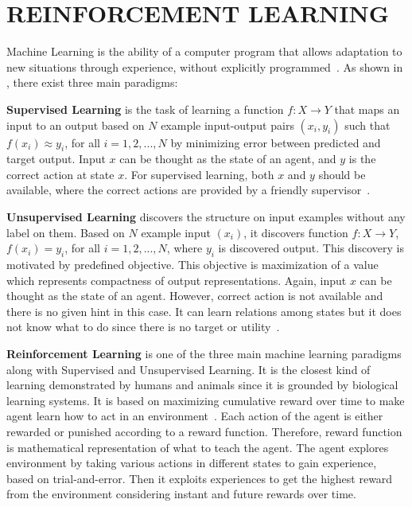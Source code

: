\chapter{REINFORCEMENT LEARNING}
\label{chap:rl_chap}

Machine Learning is the ability of a computer program that allows 
adaptation to new situations through experience, 
without explicitly programmed~\cite{mitchell_machine_1997}. 
As shown in , there exist three main paradigms: 

\textbf{Supervised Learning} is the task of learning a function $f \colon X \rightarrow Y$ 
that maps an input to an output based on $N$ example input-output pairs $(x_i,y_i)$ 
such that $ f(x_i) \approx y_i$, for all $i={1,2,...,N}$ 
by minimizing error between predicted and target output. 
Input $x$ can be thought as the state of an agent, and $y$ is the correct action at state $x$. 
For supervised learning, both $x$ and $y$ should be available, 
where the correct actions are provided by a friendly supervisor~\cite{russell_artificial_nodate}. 

\textbf{Unsupervised Learning} discovers the structure on input examples without any label on them. 
Based on $N$ example input $(x_i)$, 
it discovers function $f \colon X \rightarrow Y$, $ f(x_i) = y_i$, for all $i={1,2,...,N} $, 
where $y_i$ is discovered output. 
This discovery is motivated by predefined objective. 
This objective is maximization of a value which represents compactness of output representations. 
Again, input $x$ can be thought as the state of an agent. 
However, correct action is not available and there is no given hint in this case. 
It can learn relations among states but it does not know what to do 
since there is no target or utility~\cite{russell_artificial_nodate}.
 
\textbf{Reinforcement Learning} is one of the three main machine learning paradigms along with Supervised and Unsupervised Learning. 
It is the closest kind of learning demonstrated by humans and animals 
since it is grounded by biological learning systems. 
It is based on maximizing cumulative reward over time to make agent 
learn how to act in an environment~\cite{sutton_reinforcement_1998}. 
Each action of the agent is either rewarded or punished according to a reward function. 
Therefore, reward function is mathematical representation of what to teach the agent. 
The agent explores environment by taking various actions in different states to gain experience, based on trial-and-error. 
Then it exploits experiences to get the highest reward from the environment considering instant and future rewards over time. 

